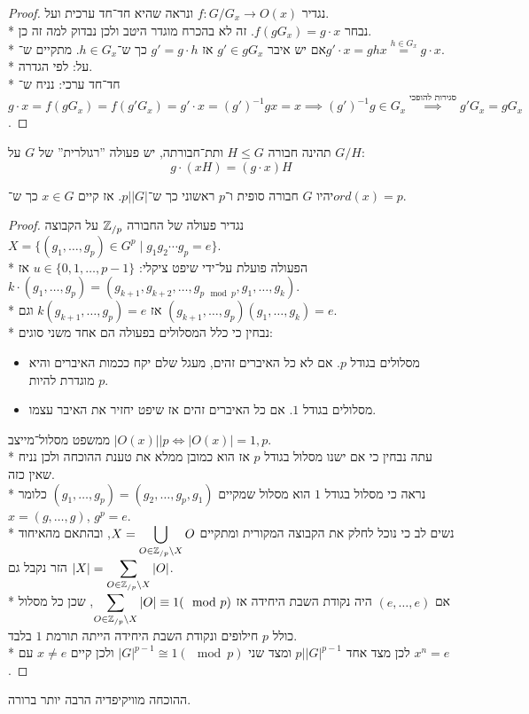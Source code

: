 \begin{proof}
	נגדיר $f : G/G_x \to O(x)$ ונראה שהיא חד־חד ערכית ועל.\\*
	נבחר $f(gG_x) = g \cdot x$. זה לא בהכרח מוגדר היטב ולכן נבדוק למה זה כן.\\*
	אם יש איבר $g' \in gG_x$ אז $g' = g \cdot h$ כך ש־$h \in G_x$. מתקיים ש־$g' \cdot x = g h x \overset{h \in G_x}{=} g \cdot x$.\\*
	על: לפי הגדרה. \\*
	חד־חד ערכי: נניח ש־$g \cdot x = f(g G_x) = f(g'G_x) = g' \cdot x = {(g')}^{-1} g x = x \implies {(g')}^{-1} g \in G_x \overset{\text{סגירות להופכי}}{\implies} g'G_x = g G_x$.
\end{proof}
\begin{example}
	תהינה חבורה $H \le G$ ותת־חבורתה, יש פעולה ''רגולרית'' של $G$ על $G / H$:
	\[
		g \cdot (x H) = (g \cdot x) H
	\]
\end{example}

\begin{theorem}
	יהיו $G$ חבורה סופית ו־$p$ ראשוני כך ש־$p \Big| |G|$. אז קיים $x \in G$ כך ש־$ord(x) = p$.
\end{theorem}
\begin{proof}
	נגדיר פעולה של החבורה $\mathbb{Z}_{/p}$ על הקבוצה $X = \{ (g_1, \dots, g_p) \in G^p \mid g_1g_2 \cdots g_p = e\}$. \\*
	הפעולה פועלת על־ידי שיפט ציקלי: $u \in \{0, 1, \dots, p - 1\}$ אז $k \cdot (g_1, \dots, g_p) = (g_{k + 1}, g_{k + 2}, \dots, g_{p \mod p}, g_{1}, \dots, g_k)$.\\*
	אז $k (g_{k + 1}, \dots, g_p) = e$ וגם $(g_{k + 1}, \dots, g_p)(g_1, \dots, g_k) = e$. \\*
	נבחין כי כלל המסלולים בפעולה הם אחד משני סוגים:
	\begin{itemize}
		\item מסלולים בגודל $p$. אם לא כל האיברים זהים, מעגל שלם יקח ככמות האיברים והיא מוגדרת להיות $p$.
		\item מסלולים בגודל $1$. אם כל האיברים זהים אז שיפט יחזיר את האיבר עצמו.
	\end{itemize}
	ממשפט מסלול־מייצב $|O(x)| \Big| p \iff |O(x)| = 1, p$.\\*
	עתה נבחין כי אם ישנו מסלול בגודל $p$ אז הוא כמובן ממלא את טענת ההוכחה ולכן נניח שאין כזה. \\*
	נראה כי מסלול בגודל $1$ הוא מסלול שמקיים $(g_1, \dots, g_p) = (g_2, \dots, g_p, g_1)$ כלומר $x = (g, \dots, g)$, $g^p = e$.\\*
	נשים לב כי נוכל לחלק את הקבוצה המקורית ומתקיים $X = \displaystyle \bigcup_{O \in \mathbb{Z}_{/p} \backslash X} O$, ובהתאם מהאיחוד הזר נקבל גם $|X| = \displaystyle \sum_{O \in \mathbb{Z}_{/p} \backslash X} |O|$. \\*
	אם $(e, \dots, e)$ היה נקודת השבת היחידה אז $\displaystyle \sum_{O \in \mathbb{Z}_{/p} \backslash X} |O| \equiv 1 (\mod p)$, שכן כל מסלול כולל $p$ חילופים ונקודת השבת היחידה הייתה תורמת $1$ בלבד. \\*
	לכן מצד אחד $p \Big| |G|^{p - 1}$ ומצד שני $|G|^{p - 1} \cong 1 (\mod p)$ ולכן קיים $x \ne e$ עם $x^n = e$.
\end{proof}
\begin{remark}
	ההוכחה מוויקיפדיה הרבה יותר ברורה.
\end{remark}

